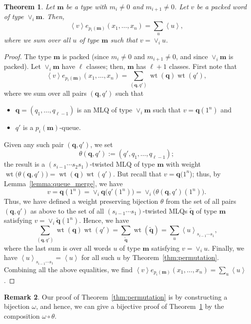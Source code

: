 \documentclass[reqno]{amsart}
\newcommand{\0}{\phantom{c}}
\newcommand{\swt}[1]{\left\langle #1 \right\rangle} %
\newcommand{\merge}[1]{\vee_{#1}} %
\DeclareMathOperator{\wt}{wt} %
\newcommand{\mm}{\mathbf{m}}
\newcommand{\qq}{\mathbf{q}}
\let\sumnonlimits\sum
\renewcommand{\sum}{\sumnonlimits\limits}
\newcommand{\tup}[1]{\left( #1 \right)}
\theoremstyle{plain}
\newtheorem{thm}{Theorem}[section]
\theoremstyle{definition}
\newtheorem{remark}[thm]{Remark}
\numberwithin{equation}{section}
\begin{document}
\begin{thm}
\label{thm:merge}
  Let $\mm$ be a type with $m_i \neq 0$ and $m_{i+1} \neq 0$.
  Let $v$ be a packed word of type $\merge{i}\mm$.
  Then,
  \[
  \swt{v} e_{p_i(\mm)}(x_1, \dotsc, x_n) = \sum_u \swt{u},
  \]
where we sum over all $u$ of type $\mm$ such that $v = \merge{i} u$.
\end{thm}

\begin{proof}
  The type $\mm$ is packed (since $m_i \neq 0$ and $m_{i+1} \neq 0$,
  and since $\merge{i}\mm$ is packed).
  Let $\merge{i}\mm$ have $\ell$ classes; then, $\mm$ has $\ell+1$
  classes.
  First note that
  \[
  \swt{v} e_{p_i(\mm)}(x_1, \dotsc, x_n) = \sum_{(\qq,q')} \wt(\qq) \wt(q'),
  \]
  where we sum over all pairs $(\qq, q')$ such that
  \begin{itemize}
  \item $\qq = (q_1, \dotsc, q_{\ell-1})$ is an MLQ of type $\merge{i}\mm$ such that $v = \qq(1^n)$ and
  \item $q'$ is a $p_i(\mm)$-queue.
  \end{itemize}
  Given any such pair $\tup{\qq, q'}$, we set
  \[
  \theta(\qq, q') := (q', q_1, \dotsc, q_{\ell-1});
  \]
  the result is a $(s_{i-1} \dotsm s_2 s_1)$-twisted MLQ of type $\mm$ with weight
  $\wt\bigl( \theta(\qq, q') \bigr) = \wt(\qq) \wt(q')$.
  But recall that $v = \qq(1^n$); thus, by Lemma~\ref{lemma:queue_merge}, we have
  \[
  v = \qq(1^n) = \merge{i} \qq\bigl( q'(1^n) \bigr) = \merge{i} \bigl( \theta(\qq, q')(1^n) \bigr).
  \]
  Thus, we have defined a weight preserving bijection $\theta$ from the set of all pairs $(\qq, q')$ as above
  to the set of all $(s_{i-1} \dotsm s_1)$-twisted MLQs $\widetilde{\qq}$ of type $\mm$ satisfying $v = \merge{i} \widetilde{\qq} (1^n)$.
  Hence, we have
  \[
  \sum_{(\qq,q')} \wt(\qq) \wt(q')
  = \sum_{\widetilde{\qq}} \wt(\widetilde{\qq})
  = \sum_u \swt{u}_{s_{i-1} \dotsm s_1} ,
  \]
  where the last sum is over all words $u$ of type $\mm$ satisfying $v = \merge{i} u$.
  Finally, we have $\swt{u}_{s_{i-1} \dotsm s_1} = \swt{u}$ for all such $u$ by Theorem~\ref{thm:permutation}.
  Combining all the above equalities, we find $\swt{v} e_{p_i(\mm)}(x_1, \dotsc, x_n) = \sum_u \swt{u}$.
\end{proof}

\begin{remark}
\label{rmk:bijective_proof}
Our proof of Theorem~\ref{thm:permutation} is by constructing a bijection $\omega$, and hence, we can give a bijective proof of Theorem~\ref{thm:merge} by the composition $\omega \circ \theta$.
\end{remark}
\end{document}
